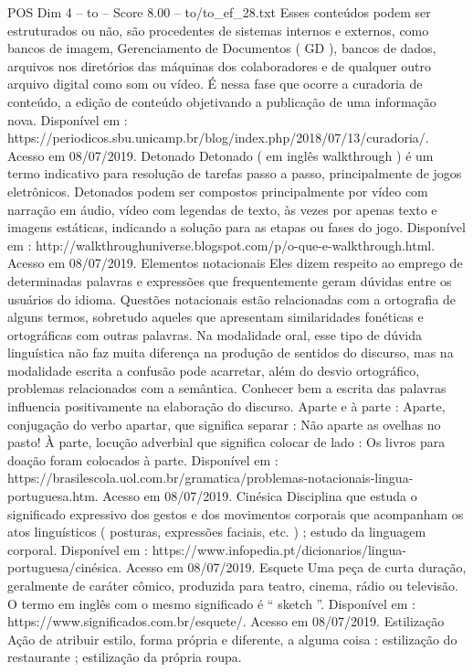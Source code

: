 \begin{textsample}{POS Dim 4 – to – Score 8.00 – to/to\_ef\_28.txt}
Esses conteúdos podem ser estruturados ou não, são procedentes de sistemas internos e externos, como bancos de imagem, Gerenciamento de Documentos ( GD ), bancos de dados, arquivos nos diretórios das máquinas dos colaboradores e de qualquer outro arquivo digital como som ou vídeo.
É nessa fase que ocorre a curadoria de conteúdo, a edição de conteúdo objetivando a publicação de uma informação nova.
Disponível em : https://periodicos.sbu.unicamp.br/blog/index.php/2018/07/13/curadoria/.
Acesso em 08/07/2019.
Detonado Detonado ( em inglês walkthrough ) é um termo indicativo para resolução de tarefas passo a passo, principalmente de jogos eletrônicos.
Detonados podem ser compostos principalmente por vídeo com narração em áudio, vídeo com legendas de texto, às vezes por apenas texto e imagens estáticas, indicando a solução para as etapas ou fases do jogo.
Disponível em : http://walkthroughuniverse.blogspot.com/p/o-que-e-walkthrough.html.
Acesso em 08/07/2019.
Elementos notacionais Eles dizem respeito ao emprego de determinadas palavras e expressões que frequentemente geram dúvidas entre os usuários do idioma.
Questões notacionais estão relacionadas com a ortografia de alguns termos, sobretudo aqueles que apresentam similaridades fonéticas e ortográficas com outras palavras.
Na modalidade oral, esse tipo de dúvida linguística não faz muita diferença na produção de sentidos do discurso, mas na modalidade escrita a confusão pode acarretar, além do desvio ortográfico, problemas relacionados com a semântica.
Conhecer bem a escrita das palavras influencia positivamente na elaboração do discurso.
Aparte e à parte : Aparte, conjugação do verbo apartar, que significa separar : Não aparte as ovelhas no pasto!
À parte, locução adverbial que significa colocar de lado : Os livros para doação foram colocados à parte.
Disponível em : https://brasilescola.uol.com.br/gramatica/problemas-notacionais-lingua-portuguesa.htm.
Acesso em 08/07/2019.
Cinésica Disciplina que estuda o significado expressivo dos gestos e dos movimentos corporais que acompanham os atos linguísticos ( posturas, expressões faciais, etc. ) ; estudo da linguagem corporal.
Disponível em : https://www.infopedia.pt/dicionarios/lingua-portuguesa/cinésica.
Acesso em 08/07/2019.
Esquete Uma peça de curta duração, geralmente de caráter cômico, produzida para teatro, cinema, rádio ou televisão.
O termo em inglês com o mesmo significado é “ sketch ”.
Disponível em : https://www.significados.com.br/esquete/.
Acesso em 08/07/2019.
Estilização Ação de atribuir estilo, forma própria e diferente, a alguma coisa : estilização do restaurante ; estilização da própria roupa.

\end{textsample}
